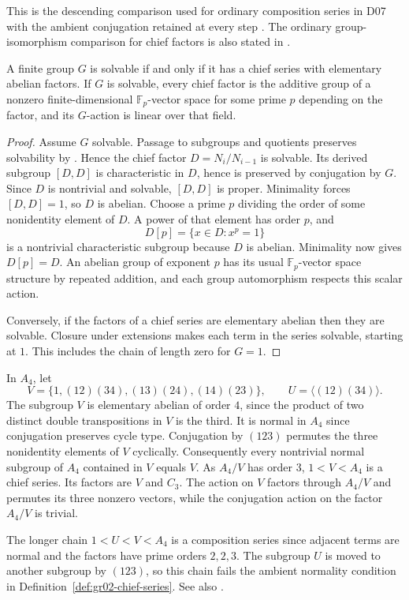 This is the descending comparison used for ordinary composition
series in D07 with the ambient conjugation retained at every step
\cite[entry K07.06.jordan\_holder\_extension]{d07}. The ordinary
group-isomorphism comparison for chief factors is also stated in
\cite[Theorem~5.9]{chief-source}.

\begin{corollary}
\label{cor:gr02-chief-solvable}
A finite group \(G\) is solvable if and only if it has a chief
series with elementary abelian factors. If \(G\) is solvable, every
chief factor is the additive group of a nonzero finite-dimensional
\(\mathbb F_p\)-vector space for some prime \(p\) depending on the
factor, and its \(G\)-action is linear over that field.
\end{corollary}
\begin{proof}
Assume \(G\) solvable. Passage to subgroups and quotients preserves
solvability by \cite[entry K07.15.solvable\_closure]{d07}. Hence the
chief factor \(D=N_i/N_{i-1}\) is solvable. Its derived subgroup
\([D,D]\) is characteristic in \(D\), hence is preserved by
conjugation by \(G\). Since \(D\) is nontrivial and solvable,
\([D,D]\) is proper. Minimality forces \([D,D]=1\), so \(D\) is
abelian. Choose a prime \(p\) dividing the order of some nonidentity
element of \(D\). A power of that element has order \(p\), and
\[
  D[p]=\{x\in D : x^p=1\}
\]
is a nontrivial characteristic subgroup because \(D\) is abelian.
Minimality now gives \(D[p]=D\). An abelian group of exponent \(p\)
has its usual \(\mathbb F_p\)-vector space structure by repeated
addition, and each group automorphism respects this scalar action.

Conversely, if the factors of a chief series are elementary
abelian then they are solvable. Closure under extensions makes
each term in the series solvable, starting at \(1\). This includes
the chain of length zero for \(G=1\).
\end{proof}

\begin{example}
\label{ex:gr02-chief-a4}
In \(A_4\), let
\[
  V=\{1,(12)(34),(13)(24),(14)(23)\},\qquad
  U=\langle(12)(34)\rangle .
\]
The subgroup \(V\) is elementary abelian of order \(4\), since the
product of two distinct double transpositions in \(V\) is the
third. It is normal in \(A_4\) since conjugation preserves cycle
type. Conjugation by \((123)\) permutes the three nonidentity
elements of \(V\) cyclically. Consequently every nontrivial
normal subgroup of \(A_4\) contained in \(V\) equals \(V\).
As \(A_4/V\) has order \(3\), \(1<V<A_4\) is a chief series.
Its factors are \(V\) and \(C_3\). The action on \(V\) factors
through \(A_4/V\) and permutes its three nonzero vectors, while
the conjugation action on the factor \(A_4/V\) is trivial.

The longer chain \(1<U<V<A_4\) is a composition series since
adjacent terms are normal and the factors have prime orders
\(2,2,3\). The subgroup \(U\) is moved to another subgroup by
\((123)\), so this chain fails the ambient normality condition
in Definition~\ref{def:gr02-chief-series}. See also
\cite[Examples~5.2 and 5.7]{chief-source}.
\end{example}
